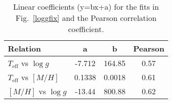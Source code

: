 \documentclass[fleqn,usenatbib]{mnras}
\begin{document}
\begin{table}
\begin{center}
\caption{Average difference and standard deviation between the synthetic spectral synthesis technique with constrained gravity and the GES benchmark values in high resolution. 
N represents the number of spectra analysed in each group.}
\label{results_table_fix}
\end{center}
\end{table}

\begin{table}
\begin{center}
\caption{Linear coefficients (y=bx+a) for the fits in Fig.~\ref{loggfix} and the Pearson correlation coefficient.}
\label{coefficients}
\begin{tabular}{lccc}
\hline\hline
	Relation 	       & a      & b      & Pearson \\
\hline
$T_{\mathrm{eff}}$ vs $\log g$ & -7.712 & 164.85 & 0.57 \\
$T_{\mathrm{eff}}$ vs $[M/H]$  & 0.1338 & 0.0018 & 0.61 \\
$[M/H]$ vs $\log g$            & -13.44 & 800.88 & 0.62 \\
\hline
\end{tabular}
\end{center}
\end{table}
\end{document}
